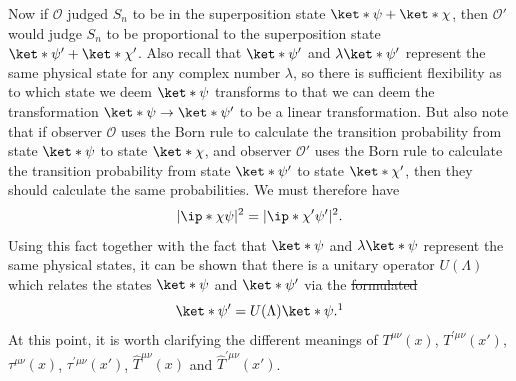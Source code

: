 \documentclass[12pt]{report}
\providecommand{\DIFadd}[1]{{\protect\color{blue}\uwave{#1}}} %
\providecommand{\DIFdel}[1]{{\protect\color{red}\sout{#1}}}                      %
\providecommand{\DIFaddbegin}{} %
\providecommand{\DIFaddend}{} %
\providecommand{\DIFdelbegin}{} %
\providecommand{\DIFdelend}{} %
\begin{document}
Now if  $\mathcal{O}$ judged $S_n$ to be in the superposition state $\ket*{\psi}+\ket*{\chi}$, then $\mathcal{O}'$ would judge $S_n$ to be proportional to the superposition state $\ket*{\psi'}+\ket*{\chi'}$. Also recall that $\ket*{\psi'}$ and $\lambda\ket*{\psi'}$ represent the same physical state for any complex number $\lambda$, so there is sufficient flexibility as to which state we deem $\ket*{\psi}$ transforms to that we can deem the transformation $\ket*{\psi}\rightarrow\ket*{\psi'}$ to be a linear transformation. But also note that if observer $\mathcal{O}$ uses the Born rule to calculate the transition probability from state $\ket*{\psi}$ to state $\ket*{\chi}$, and  observer $\mathcal{O}'$ uses the Born rule to calculate the transition probability from state $\ket*{\psi'}$ to state $\ket*{\chi'}$, then they should calculate the same probabilities. We must therefore have
$$|\ip*{\chi}{\psi}|^2=|\ip*{\chi'}{\psi'}|^2.$$
Using this fact together with the fact that $\ket*{\psi}$ and $\lambda\ket*{\psi}$ represent the same physical states, it can be shown that there is a unitary operator $U(\Lambda)$ %
%
 which relates the states $\ket*{\psi}$ and $\ket*{\psi'}$ via the \DIFdelbegin \DIFdel{formulated
}\DIFdelend \DIFaddbegin \DIFadd{formula
}\DIFaddend $$\ket*{\psi'}=U(\Lambda)\ket*{\psi}.\protect\footnotemark$$At this point, it is worth clarifying the different meanings of $T^{\mu\nu}(x)$, $T^{\prime\mu\nu}(x')$, $\tau^{\mu\nu}(x)$, $\tau^{\prime\mu\nu}(x')$,  $\hat{T}^{\mu\nu}(x)$ and $\hat{T}^{\prime\mu\nu}(x')$. 
\end{document}
